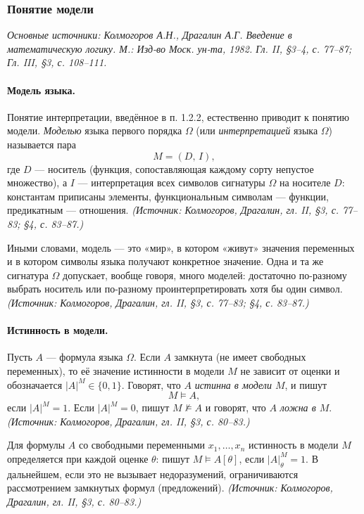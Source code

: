 \documentclass[a4paper,12pt]{article}
\begin{document}
\subsubsection{Понятие модели}

\noindent\textit{Основные источники: Колмогоров А.Н., Драгалин А.Г. Введение в математическую логику. М.: Изд-во Моск. ун-та, 1982. Гл. II, §3--4, с. 77--87; Гл. III, §3, с. 108--111.}

\paragraph{Модель языка.} Понятие интерпретации, введённое в п. 1.2.2, естественно приводит к понятию модели. \emph{Моделью} языка первого порядка \(\Omega\) (или \emph{интерпретацией} языка \(\Omega\)) называется пара
\[
M=(D,\,I),
\]
где \(D\) --- носитель (функция, сопоставляющая каждому сорту непустое множество), а \(I\) --- интерпретация всех символов сигнатуры \(\Omega\) на носителе \(D\): константам приписаны элементы, функциональным символам --- функции, предикатным --- отношения.
\textit{(Источник: Колмогоров, Драгалин, гл. II, §3, с. 77--83; §4, с. 83--87.)}

Иными словами, модель --- это «мир», в котором «живут» значения переменных и в котором символы языка получают конкретное значение. Одна и та же сигнатура \(\Omega\) допускает, вообще говоря, много моделей: достаточно по-разному выбрать носитель или по-разному проинтерпретировать хотя бы один символ.
\textit{(Источник: Колмогоров, Драгалин, гл. II, §3, с. 77--83; §4, с. 83--87.)}

\paragraph{Истинность в модели.} Пусть \(A\) --- формула языка \(\Omega\). Если \(A\) замкнута (не имеет свободных переменных), то её значение истинности в модели \(M\) не зависит от оценки и обозначается \(|A|^M\in\{0,1\}\). Говорят, что \(A\) \emph{истинна в модели \(M\)}, и пишут
\[
M\models A,
\]
если \(|A|^M=1\). Если \(|A|^M=0\), пишут \(M\not\models A\) и говорят, что \(A\) \emph{ложна в \(M\)}.
\textit{(Источник: Колмогоров, Драгалин, гл. II, §3, с. 80--83.)}

Для формулы \(A\) со свободными переменными \(x_1,\ldots,x_n\) истинность в модели \(M\) определяется при каждой оценке \(\theta\): пишут \(M\models A[\theta]\), если \(|A|^M_\theta=1\). В дальнейшем, если это не вызывает недоразумений, ограничиваются рассмотрением замкнутых формул (предложений).
\textit{(Источник: Колмогоров, Драгалин, гл. II, §3, с. 80--83.)}
\end{document}
